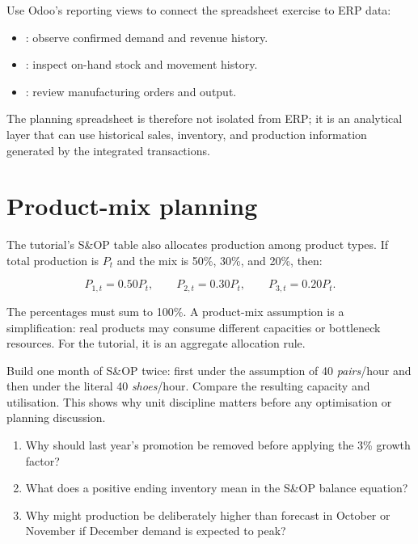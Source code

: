 \begin{odoobox}
Use Odoo's reporting views to connect the spreadsheet exercise to ERP data:
\begin{itemize}
  \item {}: observe confirmed demand and revenue history.
  \item {}: inspect on-hand stock and movement history.
  \item {}: review manufacturing orders and output.
\end{itemize}
The planning spreadsheet is therefore not isolated from ERP; it is an analytical layer that can use historical sales, inventory, and production information generated by the integrated transactions.
\end{odoobox}

\section{Product-mix planning}

The tutorial's S\&OP table also allocates production among product types. If total production is $P_t$ and the mix is 50\%, 30\%, and 20\%, then:

\[
P_{1,t}=0.50P_t,\qquad P_{2,t}=0.30P_t,\qquad P_{3,t}=0.20P_t.
\]

The percentages must sum to 100\%. A product-mix assumption is a simplification: real products may consume different capacities or bottleneck resources. For the tutorial, it is an aggregate allocation rule.

\begin{tryit}
Build one month of S\&OP twice: first under the assumption of 40 \emph{pairs}/hour and then under the literal 40 \emph{shoes}/hour. Compare the resulting capacity and utilisation. This shows why unit discipline matters before any optimisation or planning discussion.
\end{tryit}

\begin{quickcheck}
\begin{enumerate}
  \item Why should last year's promotion be removed before applying the 3\% growth factor?
  \item What does a positive ending inventory mean in the S\&OP balance equation?
  \item Why might production be deliberately higher than forecast in October or November if December demand is expected to peak?
\end{enumerate}
\end{quickcheck}

